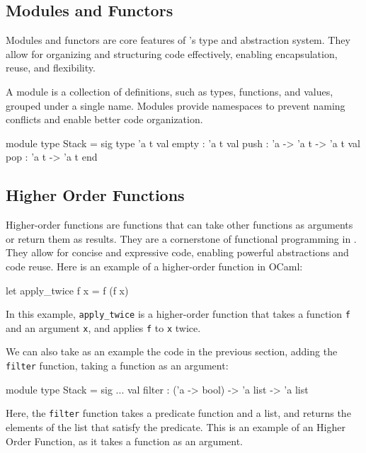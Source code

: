 \subsection{Modules and Functors} %
\label{sub:modules_and_functors}

Modules and functors are core features of \ocaml’s type and abstraction system. 
They allow for organizing and structuring code effectively, enabling encapsulation, 
reuse, and flexibility.

A module is a collection of definitions, such as types, functions, and values, 
grouped under a single name. Modules provide namespaces to prevent naming conflicts 
and enable better code organization.

\begin{ocamlenv}
    module type Stack = sig
        type 'a t
        val empty : 'a t
        val push : 'a -> 'a t -> 'a t
        val pop : 'a t -> 'a t
    end
\end{ocamlenv}

\subsection{Higher Order Functions}
\label{sub:higher_order_functions}

Higher-order functions are functions that can take other functions as arguments 
or return them as results. They are a cornerstone of functional programming in \ocaml.
They allow 
for concise and expressive code, enabling powerful abstractions and code reuse. 
Here is an example of a higher-order function in OCaml:

\begin{ocamlenv}
    let apply_twice f x = f (f x)
\end{ocamlenv}

In this example, \texttt{apply\_twice} is a higher-order function that takes a function 
\texttt{f} and an argument \texttt{x}, and applies \texttt{f} to \texttt{x} twice.

We can also take as an example the code in the previous section, adding the \texttt{filter} 
function, taking a function as an argument:

\begin{ocamlenv}
    module type Stack = sig
        ...
        val filter : ('a -> bool) -> 'a list -> 'a list
\end{ocamlenv}

Here, the \texttt{filter} function takes a predicate function and a list, and returns 
the elements of the list that satisfy the predicate. This is an example of an Higher Order 
Function, as it takes a function as an argument.

